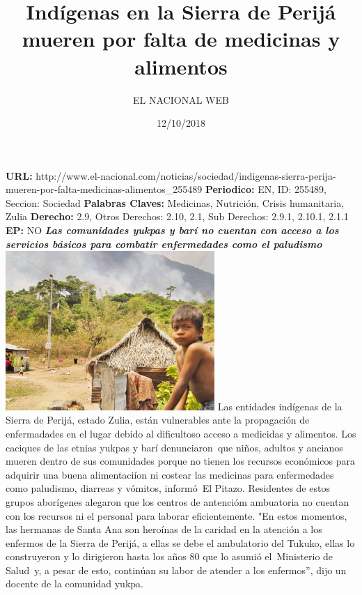 \documentclass{article}%
\title{\textbf{Indígenas en la Sierra de Perijá mueren por falta de medicinas y alimentos}}%
\author{EL NACIONAL WEB}%
\date{12/10/2018}%
\begin{document}
%
\normalsize%
\maketitle%
\textbf{URL: }%
http://www.el{-}nacional.com/noticias/sociedad/indigenas{-}sierra{-}perija{-}mueren{-}por{-}falta{-}medicinas{-}alimentos\_255489\newline%
%
\textbf{Periodico: }%
EN, %
ID: %
255489, %
Seccion: %
Sociedad\newline%
%
\textbf{Palabras Claves: }%
Medicinas, Nutrición, Crisis humanitaria, Zulia\newline%
%
\textbf{Derecho: }%
2.9, %
Otros Derechos: %
2.10, 2.1, %
Sub Derechos: %
2.9.1, 2.10.1, 2.1.1\newline%
%
\textbf{EP: }%
NO\newline%
\newline%
%
\textbf{\textit{Las comunidades yukpas y barí no cuentan con acceso a los servicios básicos para combatir enfermedades como el paludismo}}%
\newline%
\newline%
%
\includegraphics[width=300px]{176.jpg}%
\newline%
%
Las entidades indígenas de la Sierra de Perijá, estado Zulia, están vulnerables ante la propagación de enfermadades en el lugar debido al dificultoso acceso a medicidas y alimentos.%
\newline%
%
Los caciques de las etnias yukpas y barí denunciaron~que niños, adultos y ancianos mueren dentro de sus comunidades porque no tienen los recursos económicos para adquirir una buena alimentaciíon ni costear las medicinas para enfermedades como paludismo, diarreas y vómitos, informó~El Pitazo.%
\newline%
%
Residentes de estos grupos aborígenes alegaron que los centros de antencióm ambuatoria no cuentan con los recursos ni el personal para laborar eficientemente. "En estos momentos, las hermanas de Santa Ana son heroínas de la caridad en la atención a los enfermos de la Sierra de Perijá, a ellas se debe el ambulatorio del Tukuko, ellas lo construyeron y lo dirigieron hasta los años 80 que lo asumió el~Ministerio de Salud~y, a pesar de esto, continúan su labor de atender a los enfermos”, dijo un docente de la comunidad yukpa.%
\end{document}
